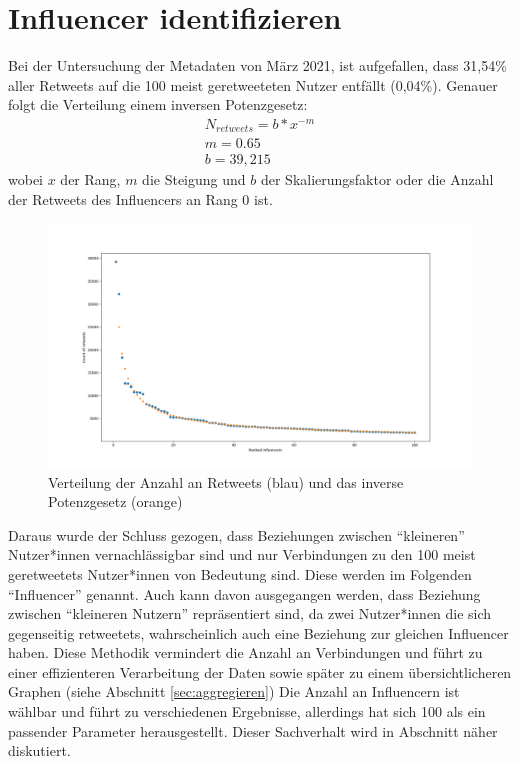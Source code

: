 \section{Influencer identifizieren}
\label{sec:influencer}
Bei der Untersuchung der Metadaten von März 2021, ist aufgefallen, dass 31,54\% aller \glspl{Retweet} auf die 100 meist geretweeteten Nutzer entfällt (0,04\%).
Genauer folgt die Verteilung einem inversen Potenzgesetz:
\begin{equation}
	\begin{aligned}
		N_{retweets} = b*x^{-m}\\
		m = 0.65\\
		b = 39,215
	\end{aligned}
\end{equation}
wobei $x$ der Rang, $m$ die Steigung und $b$ der Skalierungsfaktor oder die Anzahl der Retweets des Influencers an Rang 0 ist.\\
\begin{figure}[h!]
	\centering
	\includegraphics[width=0.8\linewidth]{images/power-law}
	\caption{Verteilung der Anzahl an \glspl{Retweet} (blau) und das inverse Potenzgesetz (orange)}
	\label{fig:tweetverteilung}
\end{figure}
Daraus wurde der Schluss gezogen, dass Beziehungen zwischen "`kleineren"' Nutzer*innen vernachlässigbar sind und nur Verbindungen zu den 100 meist \glspl{geretweetet} Nutzer*innen von Bedeutung sind. Diese werden im Folgenden "`Influencer"' genannt. Auch kann davon ausgegangen werden, dass Beziehung zwischen "`kleineren Nutzern"'  repräsentiert sind, da zwei Nutzer*innen die sich gegenseitig \glspl{retweetet}, wahrscheinlich auch eine Beziehung zur gleichen Influencer haben. 
Diese Methodik vermindert die Anzahl an Verbindungen und führt zu einer effizienteren Verarbeitung der Daten sowie später zu einem übersichtlicheren Graphen (siehe Abschnitt \ref{sec:aggregieren})
Die Anzahl an Influencern ist wählbar und führt zu verschiedenen Ergebnisse, allerdings hat sich 100 als ein passender Parameter herausgestellt. Dieser Sachverhalt wird in Abschnitt näher diskutiert.

